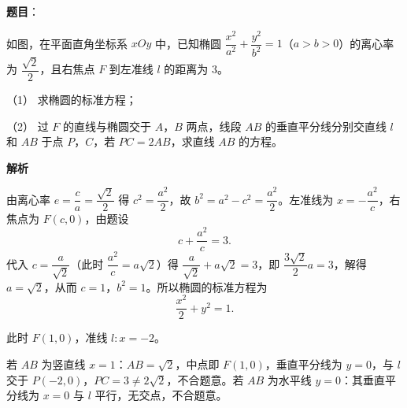 \begin{answer}

\textbf{题目}：

如图，在平面直角坐标系 \(xOy\) 中，已知椭圆 \(\dfrac{x^{2}}{a^{2}}+\dfrac{y^{2}}{b^{2}}=1\)（\(a>b>0\)）的离心率为 \(\dfrac{\sqrt{2}}{2}\)，且右焦点 \(F\) 到左准线 \(l\) 的距离为 3。

（1） 求椭圆的标准方程；

（2） 过 \(F\) 的直线与椭圆交于 \(A\)，\(B\) 两点，线段 \(AB\) 的垂直平分线分别交直线 \(l\) 和 \(AB\) 于点 \(P\)，\(C\)，若 \(PC=2AB\)，求直线 \(AB\) 的方程。
\nopagebreak[4]
\begin{center}\end{center}
\nopagebreak[4]
\textbf{解析}


由离心率 \(e=\dfrac{c}{a}=\dfrac{\sqrt{2}}{2}\) 得 \(c^{2}=\dfrac{a^{2}}{2}\)，故 \(b^{2}=a^{2}-c^{2}=\dfrac{a^{2}}{2}\)。左准线为 \(x=-\dfrac{a^{2}}{c}\)，右焦点为 \(F(c,0)\)，由题设
\nopagebreak[4]
\[
c+\frac{a^{2}}{c}=3.
\]
代入 \(c=\dfrac{a}{\sqrt{2}}\)（此时 \(\dfrac{a^{2}}{c}=a\sqrt{2}\)）得 \(\dfrac{a}{\sqrt{2}}+a\sqrt{2}=3\)，即 \(\dfrac{3\sqrt{2}}{2}a=3\)，解得 \(a=\sqrt{2}\)，从而 \(c=1\)，\(b^{2}=1\)。所以椭圆的标准方程为
\nopagebreak[4]
\[
\frac{x^{2}}{2}+y^{2}=1.
\]


此时 \(F(1,0)\)，准线 \(l:x=-2\)。

若 \(AB\) 为竖直线 \(x=1\)：\(AB=\sqrt{2}\)，中点即 \(F(1,0)\)，垂直平分线为 \(y=0\)，与 \(l\) 交于 \(P(-2,0)\)，\(PC=3\ne2\sqrt{2}\)，不合题意。若 \(AB\) 为水平线 \(y=0\)：其垂直平分线为 \(x=0\) 与 \(l\) 平行，无交点，不合题意。


\end{answer}
